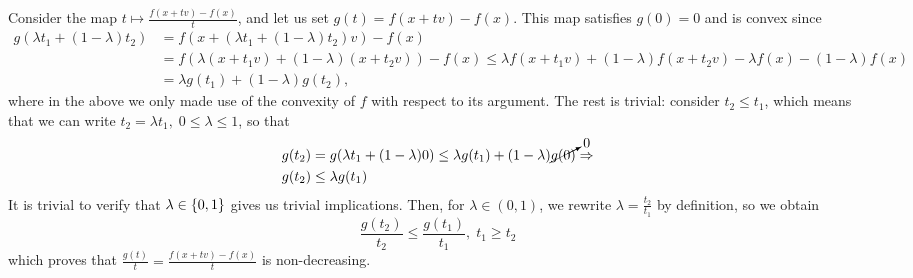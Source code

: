 \documentclass[10pt]{article}
\begin{document}
\begin{Exercise}
	\label{ex:p4}
	\ExePart

	Consider the map $t \mapsto \frac{f(x + tv) - f(x)}{t}$, and let us set
	$g(t) = f(x + tv) - f(x)$. This map satisfies $g(0) = 0$ and is convex since
	\begin{align*}
		g(\lambda t_1 + (1 - \lambda) t_2) &=
		f\left(x + (\lambda t_1 + (1 - \lambda) t_2) v \right) - f(x) \\
		&= f(\lambda (x + t_1 v) + (1 - \lambda) (x + t_2 v)) - f(x)
		\leq \lambda f(x + t_1 v) + (1 - \lambda) f(x + t_2 v)
			- \lambda f(x) - (1 - \lambda) f(x) \\
		&= \lambda g(t_1) + (1 - \lambda) g(t_2),
	\end{align*}
	where in the above we only made use of the convexity of $f$ with respect to
	its argument. The rest is trivial: consider $t_2 \leq t_1$, which means that
	we can write $t_2 = \lambda t_1, \; 0 \leq \lambda \leq 1$, so that
	\begin{align*}
		g(t_2) &= g(\lambda t_1 + (1 - \lambda) 0) \leq
			\lambda g(t_1) + (1 - \lambda) \cancelto{0}{g(0)} \Rightarrow \\
			g(t_2) &\leq \lambda g(t_1)
	\end{align*}
	It is trivial to verify that $\lambda \in \left\{ 0, 1 \right\}$ gives us trivial
	implications. Then, for $\lambda \in (0, 1)$, we rewrite $\lambda =
	\frac{t_2}{t_1}$ by definition, so we obtain
	\[
		\frac{g(t_2)}{t_2} \leq \frac{g(t_1)}{t_1}, \; t_1 \geq t_2
	\]
	which proves that $\frac{g(t)}{t} = \frac{f(x + tv) - f(x)}{t}$ is
	non-decreasing.

	\ExePart


\end{Exercise}
\end{document}
